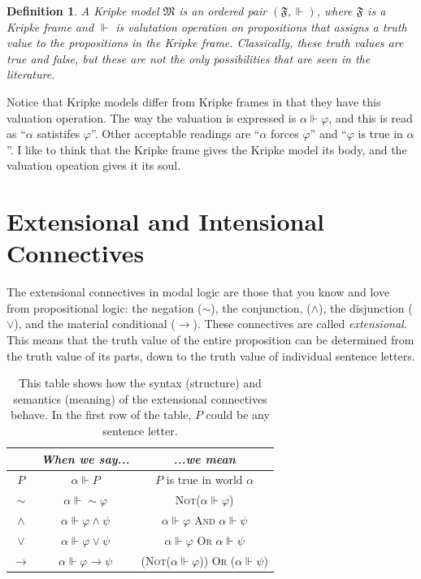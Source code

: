 \documentclass[12pt]{article}
\renewcommand{\phi}{\varphi}
\DeclareMathOperator{\forces}{\Vdash}
\newtheorem{definition}{Definition}[section]
\begin{document}
\begin{definition}
    A Kripke model $\mathfrak{M}$ is an ordered pair $(\mathfrak{F}, \forces)$, where $\mathfrak{F}$ is a Kripke frame and $\forces$ is 
    \emph{valutation operation} on propositions that assigns a truth value to the propositions in the Kripke frame. Classically, these truth values
    are \emph{true} and \emph{false}, but these are not the only possibilities that are seen in the literature.
\end{definition}    

Notice that Kripke models differ from Kripke frames in that they have this valuation operation. The way the valuation is expressed is $\alpha \forces
\phi$, and this is read as ``$\alpha$ satistifes $\phi$''. Other acceptable readings are ``$\alpha$ forces $\phi$'' and ``$\phi$ is true
in $\alpha$''. I like to think that the Kripke frame gives the Kripke model its body, and the valuation opeation gives it its soul.

\section{Extensional and Intensional Connectives}

The extensional connectives in modal logic are those that you know and love from propositional logic: the negation ($\sim$), the conjunction,
($\wedge$), the disjunction ($\vee$), and the material conditional ($\rightarrow$). These connectives are called \emph{extensional}. This means
that the truth value of the entire proposition can be determined from the truth value of its parts, down to the truth value of individual sentence
letters.

\begin{table}[h]
    \centering
    \begin{tabular}{| c | c | c |}
        \hline
        & \emph{When we say...} & \emph{...we mean} \\
        \hline
        $P$ & $\alpha \forces P$ & $P$ is true in world $\alpha$ \\
        \hline
        $\sim$ & $\alpha \forces \sim \! \phi$ & \textsc{Not}($\alpha \forces \phi$) \\
        \hline
        $\wedge$ & $\alpha \forces \phi \wedge \psi$ & $\alpha \forces \phi$ \textsc{And} $\alpha \forces \psi$ \\
        \hline
        $\vee$ & $\alpha \forces \phi \vee \psi$ & $\alpha \forces \phi$ \textsc{Or} $\alpha \forces \psi$ \\
        \hline
        $\rightarrow$ & $\alpha \forces \phi \rightarrow \psi$ & (\textsc{Not}($\alpha \forces \phi$)) \textsc{Or} ($\alpha \forces \psi$) \\
        \hline
    \end{tabular}
    \caption{This table shows how the syntax (structure) and semantics (meaning) of the extensional connectives behave. In the first row of the 
    table, $P$ could be any sentence letter.}
    \label{Extensional Table}
\end{table}
\end{document}
